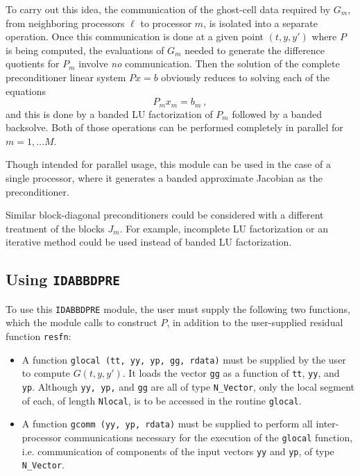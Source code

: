 To carry out this idea, the communication of the ghost-cell data
required by $G_m$, from neighboring processors $\ell$ to processor
$m$, is isolated into a separate operation.  Once this communication
is done at a given point $(t,y,y')$ where $P$ is being computed, the
evaluations of $G_m$ needed to generate the difference quotients for
$P_m$ involve {\em no} communication.  Then the solution of the
complete preconditioner linear system $Px = b$ obviously reduces to
solving each of the equations
\begin{equation}
P_m x_m = b_m ~,   \label{pblocksys}
\end{equation}
and this is done by a banded LU factorization of $P_m$ followed by a
banded backsolve.  Both of those operations can be performed
completely in parallel for $m = 1, \ldots M$.

Though intended for parallel usage, this module can be used in the
case of a single processor, where it generates a banded approximate
Jacobian as the preconditioner.

Similar block-diagonal preconditioners could be considered with a
different treatment of the blocks $J_m$.  For example, incomplete LU
factorization or an iterative method could be used instead of banded
LU factorization.


\subsection{Using {\tt IDABBDPRE}}

To use this {\tt IDABBDPRE} module, the user must supply the following
two functions, which the module calls to construct $P$, in addition to
the user-supplied residual function {\tt resfn}:

\begin{itemize}

\item A function {\tt glocal (tt, yy, yp, gg, rdata)} must be supplied
by the user to compute $G(t,y,y')$.  It loads the vector {\tt gg} as
a function of {\tt tt}, {\tt yy}, and {\tt yp}.  Although 
{\tt yy, yp,} and {\tt gg} are all of type {\tt N\_Vector}, only the
local segment of each, of length {\tt Nlocal}, is to be accessed in
the routine {\tt glocal}.

\item  A function {\tt gcomm (yy, yp, rdata)} must be supplied to
perform all inter-processor communications necessary for the execution
of the {\tt glocal} function, i.e. communication of components of the
input vectors {\tt yy} and {\tt yp}, of type {\tt N\_Vector}.

\end{itemize}

